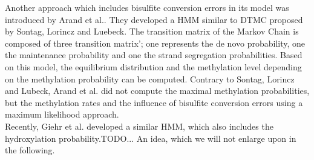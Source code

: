 Another approach which includes bisulfite conversion errors in its model was introduced by Arand et al..\cite{Wolf} They developed a \ac{HMM} similar to \ac{DTMC} proposed by Sontag, Lorincz and Luebeck.\cite{Sontag} The transition matrix of the Markov Chain is composed of three transition matrix'; one represents the de novo probability, one the maintenance probability and one the strand segregation probabilities. Based on this model, the equilibrium distribution and the methylation level depending on the methylation probability can be computed. Contrary to Sontag, Lorincz and Lubeck, Arand et al. did not compute the maximal methylation probabilities, but the methylation rates and the influence of bisulfite conversion errors using a maximum likelihood approach.\cite{Wolf}\\

Recently, Giehr et al. developed a similar \ac{HMM}, which also includes the hydroxylation probability.TODO... An idea, which we will not enlarge upon in the following.\cite{Giehr}\\